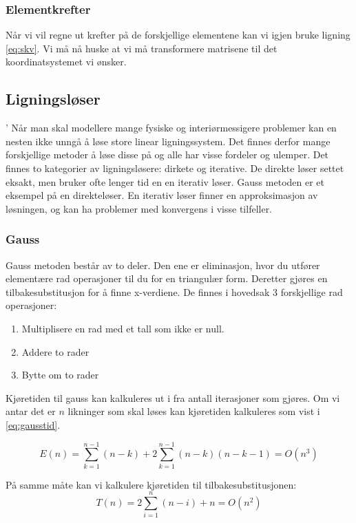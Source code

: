 \documentclass[10pt,a4paper, norsk]{article}
\begin{document}
\subsubsection{Elementkrefter}
Når vi vil regne ut krefter på de forskjellige elementene kan vi igjen bruke ligning \ref{eq:skv}. Vi må nå huske at vi må transformere matrisene til det koordinatsystemet vi ønsker. 


\subsection{Ligningsløser}'
Når man skal modellere mange fysiske og interiørmessigere problemer kan en nesten ikke unngå å løse store linear ligningssystem. Det finnes derfor mange forskjellige metoder å løse disse på og alle har visse fordeler og ulemper.
Det finnes to kategorier av ligningsløsere: dirkete og iterative. De direkte løser settet eksakt, men bruker ofte lenger tid en en iterativ løser. Gauss metoden er et eksempel på en direkteløser. En iterativ løser finner en approksimasjon av løsningen, og kan ha problemer med konvergens i visse tilfeller. 

\subsubsection{Gauss}

Gauss metoden består av to deler. Den ene er eliminasjon, hvor du utfører elementære rad operasjoner til du for en triangulær form. Deretter gjøres en tilbakesubstitusjon for å finne x-verdiene. De finnes i hovedsak 3 forskjellige rad operasjoner:
\begin{enumerate}
\item Multiplisere en rad med et tall som ikke er null.
\item Addere to rader
\item Bytte om to rader
\end{enumerate}

Kjøretiden til gauss kan kalkuleres ut i fra antall iterasjoner som gjøres. Om vi antar det er $n$ likninger som skal løses kan kjøretiden kalkuleres som vist i \eqref{eq:gausstid}.

\begin{equation} \label{eq:gausstid}
E(n) = \sum_{k=1}^{n-1} (n-k) + 2 \sum_{k=1}^{n-1} (n-k)(n-k-1) = O(n^3)
\end{equation}

På samme måte kan vi kalkulere kjøretiden til tilbakesubstitusjonen:
\begin{equation} \label{eq:gaussseideltid}
T(n) = 2\sum_{i=1}^{n} (n-i) + n = O(n^2)
\end{equation}
\end{document}
